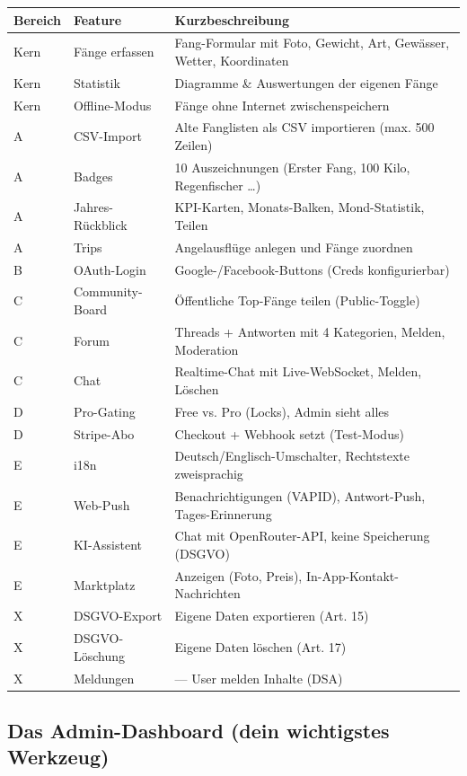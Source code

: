 \documentclass[11pt, a4paper]{article}
\newcommand{\code}[1]{\colorbox{codebg}{\texttt{\small\detokenize{#1}}}}
\begin{document}
\begin{tabularx}{\textwidth}{llX}
\toprule
\textbf{Bereich} & \textbf{Feature} & \textbf{Kurzbeschreibung} \\
\midrule
Kern & Fänge erfassen & Fang-Formular mit Foto, Gewicht, Art, Gewässer, Wetter, Koordinaten \\
Kern & Statistik & Diagramme \& Auswertungen der eigenen Fänge \\
Kern & Offline-Modus & Fänge ohne Internet zwischenspeichern \\
A & CSV-Import & Alte Fanglisten als CSV importieren (max. 500 Zeilen) \\
A & Badges & 10 Auszeichnungen (Erster Fang, 100 Kilo, Regenfischer \dots) \\
A & Jahres-Rückblick & KPI-Karten, Monats-Balken, Mond-Statistik, Teilen \\
A & Trips & Angelausflüge anlegen und Fänge zuordnen \\
B & OAuth-Login & Google-/Facebook-Buttons (Creds konfigurierbar) \\
C & Community-Board & Öffentliche Top-Fänge teilen (Public-Toggle) \\
C & Forum & Threads + Antworten mit 4 Kategorien, Melden, Moderation \\
C & Chat & Realtime-Chat mit Live-WebSocket, Melden, Löschen \\
D & Pro-Gating & Free vs. Pro (Locks), Admin sieht alles \\
D & Stripe-Abo & Checkout + Webhook setzt \code{is\_pro} (Test-Modus) \\
E & i18n & Deutsch/Englisch-Umschalter, Rechtstexte zweisprachig \\
E & Web-Push & Benachrichtigungen (VAPID), Antwort-Push, Tages-Erinnerung \\
E & KI-Assistent & Chat mit OpenRouter-API, keine Speicherung (DSGVO) \\
E & Marktplatz & Anzeigen (Foto, Preis), In-App-Kontakt-Nachrichten \\
X & DSGVO-Export & Eigene Daten exportieren (Art. 15) \\
X & DSGVO-Löschung & Eigene Daten löschen (Art. 17) \\
X & Meldungen & \code{content\_reports} — User melden Inhalte (DSA) \\
\bottomrule
\end{tabularx}

\subsection{Das Admin-Dashboard (dein wichtigstes Werkzeug)}
\end{document}
